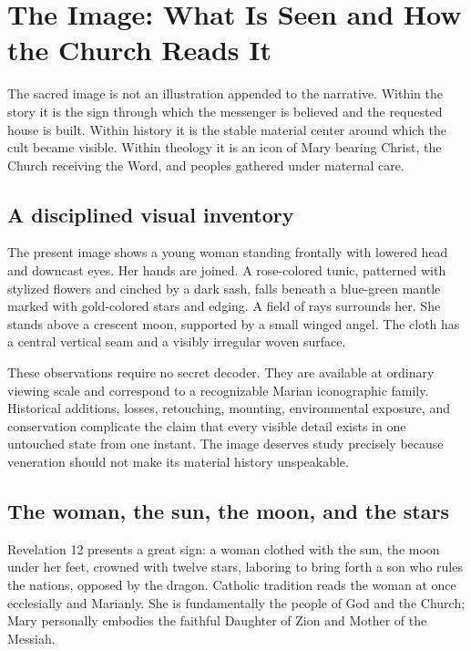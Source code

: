 \section{The Image: What Is Seen and How the Church Reads It}

The sacred image is not an illustration appended to the narrative. Within the story it is the sign through which the messenger is believed and the requested house is built. Within history it is the stable material center around which the cult became visible. Within theology it is an icon of Mary bearing Christ, the Church receiving the Word, and peoples gathered under maternal care.

\subsection{A disciplined visual inventory}

The present image shows a young woman standing frontally with lowered head and downcast eyes. Her hands are joined. A rose-colored tunic, patterned with stylized flowers and cinched by a dark sash, falls beneath a blue-green mantle marked with gold-colored stars and edging. A field of rays surrounds her. She stands above a crescent moon, supported by a small winged angel. The cloth has a central vertical seam and a visibly irregular woven surface.

These observations require no secret decoder. They are available at ordinary viewing scale and correspond to a recognizable Marian iconographic family. Historical additions, losses, retouching, mounting, environmental exposure, and conservation complicate the claim that every visible detail exists in one untouched state from one instant. The image deserves study precisely because veneration should not make its material history unspeakable.

\subsection{The woman, the sun, the moon, and the stars}

Revelation 12 presents a great sign: a woman clothed with the sun, the moon under her feet, crowned with twelve stars, laboring to bring forth a son who rules the nations, opposed by the dragon. Catholic tradition reads the woman at once ecclesially and Marianly. She is fundamentally the people of God and the Church; Mary personally embodies the faithful Daughter of Zion and Mother of the Messiah.

